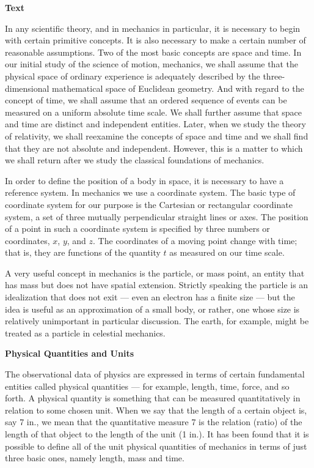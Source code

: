 \documentclass[a4paper]{article}
\newcommand{\ESect}[1]{\medskip\par{\large \textbf{#1}}\par}
\begin{document}
\ESect{Text}
In any scientific theory, and in mechanics in particular, it is necessary to begin with certain primitive concepts. It is
also necessary to make a certain number of reasonable assumptions. Two of the most basic concepts are space and time. In our
initial study of the science of motion, mechanics, we shall assume that the physical space of ordinary experience is adequately
described by the three-dimensional mathematical space of Euclidean geometry. And with regard to the concept of time, we shall
assume that an ordered sequence of events can be measured on a uniform absolute time scale. We shall further assume that space
and time are distinct and independent entities. Later, when we study the theory of relativity, we shall reexamine the concepts
of space and time and we shall find that they are not absolute and independent. However, this is a matter to which we shall
return after we study the classical foundations of mechanics.

In order to define the position of a body in space, it is necessary to have a reference system. In mechanics we use a coordinate
system. The basic type of coordinate system for our purpose is the Cartesian or rectangular coordinate system, a set of three
mutually perpendicular straight lines or axes. The position of a point in such a coordinate system is specified by three numbers
or coordinates, $x$, $y$, and $z$. The coordinates of a moving point change with time; that is, they are functions of the
quantity $t$ as measured on our time scale.

A very useful concept in mechanics is the particle, or mass point, an entity that has mass but does not have spatial extension.
Strictly speaking the particle is an idealization that does not exit --- even an electron has a finite size --- but the idea
is useful as an approximation of a small body, or rather, one whose size is relatively unimportant in particular discussion.
The earth, for example, might be treated as a particle in celestial mechanics.

\textbf{Physical Quantities and Units}

The observational data of physics are expressed in terms of certain fundamental entities called physical quantities --- for
example, length, time, force, and so forth. A physical quantity is something that can be measured quantitatively in relation
to some chosen unit. When we say that the length of a certain object is, say 7 in., we mean that the quantitative measure
7 is the relation (ratio) of the length of that object to the length of the unit (1 in.). It has been found that it is
possible to define all of the unit physical quantities of mechanics in terms of just three basic ones, namely length, mass and
time.
\end{document}
